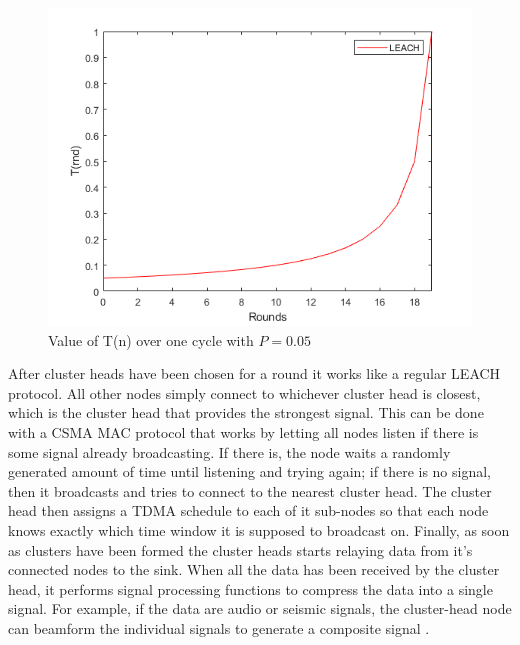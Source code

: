 \begin{figure}
    \centering
    \includegraphics[scale=0.9]{Images/LEACHplot.png}
    \caption{Value of T(n) over one cycle with $P=0.05$}
    \label{fig:LEACHplot}
\end{figure}

\noindent After cluster heads have been chosen for a round it works like a regular LEACH protocol. All other nodes simply connect to whichever cluster head is closest, which is the cluster head that provides the strongest signal. This can be done with a CSMA MAC protocol that works by letting all nodes listen if there is some signal already broadcasting. If there is, the node waits a randomly generated amount of time until listening and trying again; if there is no signal, then it broadcasts and tries to connect to the nearest cluster head. The cluster head then assigns a TDMA schedule to each of it sub-nodes so that each node knows exactly which time window it is supposed to broadcast on.
Finally, as soon as clusters have been formed the cluster heads starts relaying data from it's connected nodes to the sink. When all the data has been received by the cluster head, it performs signal processing functions to compress the data into a single signal. For example, if the data are audio or seismic signals, the cluster-head node can beamform the individual signals to generate a composite signal \cite{heinzelman2000energy}.

